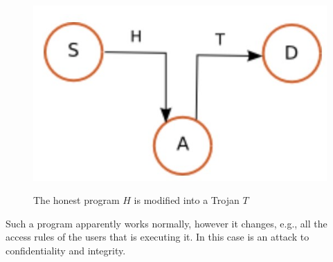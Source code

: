 \begin{enumerate}
    \begin{figure}[h!]
        \centering
        \includegraphics[scale = 0.7]{img/sec6.jpg}
        \label{sec6}
        \caption{The honest program $H$ is modified into a Trojan $T$}
    \end{figure}

    Such a program apparently works normally, however it changes, e.g., all the access rules of the users that is executing it. In this case is an attack to confidentiality and integrity.
\end{enumerate}



